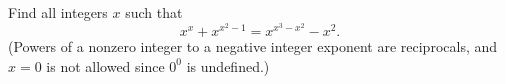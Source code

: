 Find all integers $x$ such that
\[
x^x+x^{x^2-1}=x^{x^3-x^2}-x^2 .
\]
(Powers of a nonzero integer to a negative integer exponent are reciprocals, and $x=0$ is not allowed since $0^0$ is undefined.)
